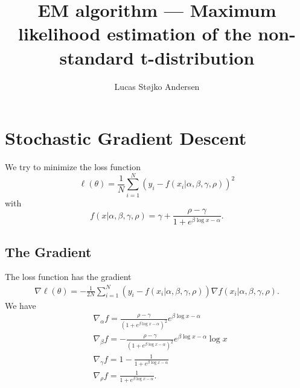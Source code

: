 \documentclass[a4paper,12pt]{article}
\title{EM algorithm --- Maximum likelihood estimation of the non-standard t-distribution}
\author{Lucas Støjko Andersen}
\begin{document}
\maketitle
\section{Stochastic Gradient Descent}
We try to minimize the loss function
\begin{equation}
    \ell(\theta)=\frac{1}{N}\sum_{i=1}^{N}(y_{i}-f(x_{i}|\alpha, \beta,\gamma,\rho))^{2}
\end{equation}
with
\begin{equation}
    f(x|\alpha,\beta,\gamma,\rho)=\gamma + \frac{\rho - \gamma}{1 + e^{\beta\log x -\alpha}}.
\end{equation}
\subsection{The Gradient}
The loss function has the gradient
\begin{align*}
    \nabla\ell(\theta) = -\frac{1}{2N}\sum_{i=1}^{N}(y_{i}-f(x_{i}|\alpha,\beta,\gamma,\rho))\nabla f(x_{i}|\alpha,\beta,\gamma,\rho).
\end{align*}
We have
\begin{align*}
    &\nabla_{\alpha}f = \frac{\rho - \gamma}{\left(1 + e^{\beta\log x - \alpha}\right)^{2}}e^{\beta\log x - \alpha}\\
    &\nabla_{\beta}f = -\frac{\rho - \gamma}{\left(1 + e^{\beta\log x - \alpha}\right)^{2}}e^{\beta\log x - \alpha}\log x\\
    &\nabla_{\gamma}f = 1 - \frac{1}{1 + e^{\beta\log x -\alpha}}\\
    &\nabla_{\rho}f=\frac{1}{1 + e^{\beta\log x -\alpha}}.
\end{align*}
\end{document}
